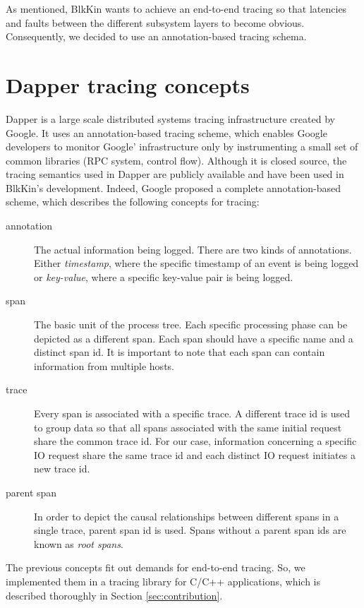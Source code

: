As mentioned, BlkKin wants to achieve an end-to-end tracing so that latencies
and faults between the different subsystem layers to become obvious.
Consequently, we decided to use an annotation-based tracing schema.

\section{Dapper tracing concepts}\label{sec:dapper}

Dapper\cite{dapper} is a large scale distributed systems tracing infrastructure
created by Google. It uses an annotation-based tracing scheme, which enables
Google developers to monitor Google' infrastructure only by instrumenting a
small set of common libraries (RPC system, control flow). Although it is closed
source, the tracing semantics used in Dapper are publicly available and have
been used in BlkKin's development. Indeed, Google proposed a complete
annotation-based scheme, which describes the following concepts for tracing:

\begin{description}
\item[annotation]
The actual information being logged. There are two kinds of annotations. Either
\emph{timestamp}, where the specific timestamp of an event is being logged or
\emph{key-value}, where a specific key-value pair is being logged.
\item[span]
The basic unit of the process tree. Each specific processing phase can be
depicted as a different span. Each span should have a specific name and a
distinct span id. It is important to note that each span can contain information
from multiple hosts.
\item[trace]
Every span is associated with a specific trace. A different trace id is used to
group data so that all spans associated with the same initial request share the
common trace id. For our case, information concerning a specific IO request
share the same trace id and each distinct IO request initiates a new trace id.
\item[parent span]
In order to depict the causal relationships between different spans in a single
trace, parent span id is used. Spans without a parent span ids are  known as
\emph{root spans}.
\end{description}

The previous concepts fit out demands for end-to-end tracing. So, we implemented
them in a tracing library for C/C++ applications, which is described thoroughly
in Section \ref{sec:contribution}.
 
